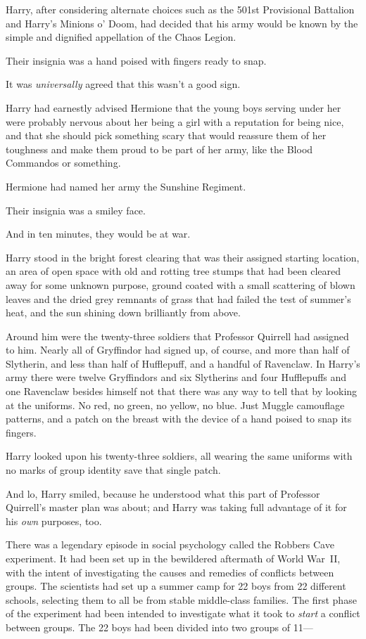 Harry, after considering alternate choices such as the 501st Provisional
Battalion and Harry's Minions o' Doom, had decided that his army would be known
by the simple and dignified appellation of the Chaos Legion.

Their insignia was a hand poised with fingers ready to snap.

It was \emph{universally} agreed that this wasn't a good sign.

Harry had earnestly advised Hermione that the young boys serving under her were
probably nervous about her being a girl with a reputation for being nice, and
that she should pick something scary that would reassure them of her toughness
and make them proud to be part of her army, like the Blood Commandos or
something.

Hermione had named her army the Sunshine Regiment.

Their insignia was a smiley face.

And in ten minutes, they would be at war.

Harry stood in the bright forest clearing that was their assigned starting
location, an area of open space with old and rotting tree stumps that had been
cleared away for some unknown purpose, ground coated with a small scattering of
blown leaves and the dried grey remnants of grass that had failed the test of
summer's heat, and the sun shining down brilliantly from above.

Around him were the twenty-three soldiers that Professor Quirrell had assigned
to him. Nearly all of Gryffindor had signed up, of course, and more than half
of Slytherin, and less than half of Hufflepuff, and a handful of Ravenclaw. In
Harry's army there were twelve Gryffindors and six Slytherins and four
Hufflepuffs and one Ravenclaw besides himself{\el} not that there was any
way to tell that by looking at the uniforms. No red, no green, no yellow, no
blue. Just Muggle camouflage patterns, and a patch on the breast with the
device of a hand poised to snap its fingers.

Harry looked upon his twenty-three soldiers, all wearing the same uniforms with
no marks of group identity save that single patch.

And lo, Harry smiled, because he understood what this part of Professor
Quirrell's master plan was about; and Harry was taking full advantage of it for
his \emph{own} purposes, too.

There was a legendary episode in social psychology called the Robbers Cave
experiment. It had been set up in the bewildered aftermath of World War~II,
with the intent of investigating the causes and remedies of conflicts between
groups. The scientists had set up a summer camp for 22 boys from 22 different
schools, selecting them to all be from stable middle-class families. The first
phase of the experiment had been intended to investigate what it took to
\emph{start} a conflict between groups. The 22 boys had been divided into two
groups of 11---


